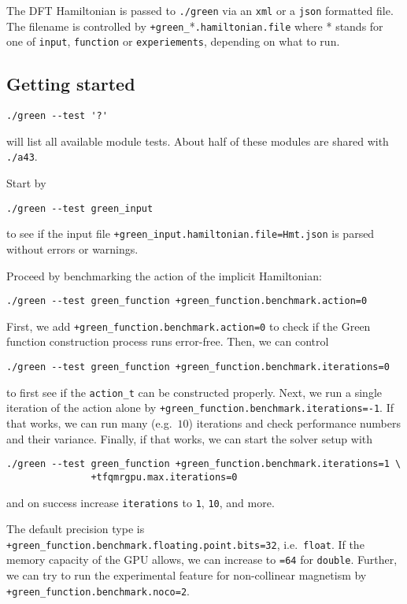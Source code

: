 \documentclass[oribibl]{llncs}
\newcommand{\ttt}[1]{\texttt{#1}}
\begin{document}
\noindent
The \ac{DFT} Hamiltonian is passed to \ttt{./green} via an \ttt{xml} or a \ttt{json} formatted file.
The filename is controlled by \ttt{+green\_}*\ttt{.hamiltonian.file} where * stands for one of
\ttt{input}, \ttt{function} or \ttt{experiements}, depending on what to run.

\subsection{Getting started} \label{sec:green-getting-started}
%
\begin{verbatim}
./green --test '?'
\end{verbatim}
will list all available module tests. About half of these modules are shared with \ttt{./a43}.

%
\noindent
Start by
\begin{verbatim}
./green --test green_input
\end{verbatim}
to see if the input file \ttt{+green\_input.hamiltonian.file=Hmt.json} is parsed without errors or warnings.

%
\noindent
Proceed by benchmarking the action of the implicit Hamiltonian:
\begin{verbatim}
./green --test green_function +green_function.benchmark.action=0
\end{verbatim}
First, we add \ttt{+green\_function.benchmark.action=0} to check if the Green function construction process runs error-free.
Then, we can control 
\begin{verbatim}
./green --test green_function +green_function.benchmark.iterations=0
\end{verbatim}
to first see if the \ttt{action\_t} can be constructed properly.
Next, we run a single iteration of the action alone by \ttt{+green\_function.benchmark.iterations=-1}.
If that works, we can run many (e.g.~$10$) iterations and check performance numbers and their variance.
Finally, if that works, we can start the solver setup with 
\begin{verbatim}
./green --test green_function +green_function.benchmark.iterations=1 \
			   +tfqmrgpu.max.iterations=0
\end{verbatim}
and on success increase \ttt{iterations} to \ttt{1}, \ttt{10}, and more.

%
\noindent
The default precision type is \ttt{+green\_function.benchmark.floating.point.bits=32}, i.e.~\ttt{float}.
If the memory capacity of the \ac{GPU} allows, we can increase to \ttt{=64} for \ttt{double}.
Further, we can try to run the experimental feature for non-collinear magnetism by \ttt{+green\_function.benchmark.noco=2}.
\end{document}

